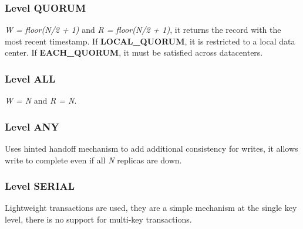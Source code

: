 		\subsubsection{Level QUORUM}
		\textit{W = floor(N/2 + 1)} and \textit{R = floor(N/2 + 1)}, it returns the record with the most recent timestamp.\newline
		If \textbf{LOCAL\_QUORUM}, it is restricted to a local data center.
		If \textbf{EACH\_QUORUM}, it must be satisfied across datacenters.
		\subsubsection{Level ALL}
		\textit{W = N} and \textit{R = N}.
		\subsubsection{Level ANY}
		Uses hinted handoff mechanism to add additional consistency for writes, it allows write to complete even if all \textit{N} replicas are down.
		\subsubsection{Level SERIAL}
		Lightweight transactions are used, they are a simple mechanism at the single key level, there is no support for multi-key transactions.
	
		
